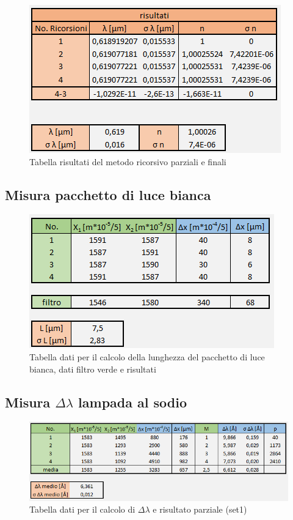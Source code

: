 \documentclass{article}
\begin{document}
\begin{figure}[h!]
  \centering
  \includegraphics[width=0.6\linewidth]{IM tabella ricorsione}
  \caption{Tabella risultati del metodo ricorsivo parziali e finali}
\end{figure}


\pagebreak

\subsection{Misura pacchetto di luce bianca}

\begin{figure}[h!]
  \centering
  \includegraphics[width=0.6\linewidth]{IM tabella pacchetto}
  \caption{Tabella dati per il calcolo della lunghezza del pacchetto di luce bianca, dati filtro verde e risultati}
\end{figure}

\subsection{Misura $\Delta\lambda$ lampada al sodio}

\begin{figure}[h!]
  \centering
  \includegraphics[width=0.75\linewidth]{IM tabella delta lambda set 1}
  \caption{Tabella dati per il calcolo di $\Delta\lambda$ e risultato parziale (set1)}
\end{figure}
\end{document}
